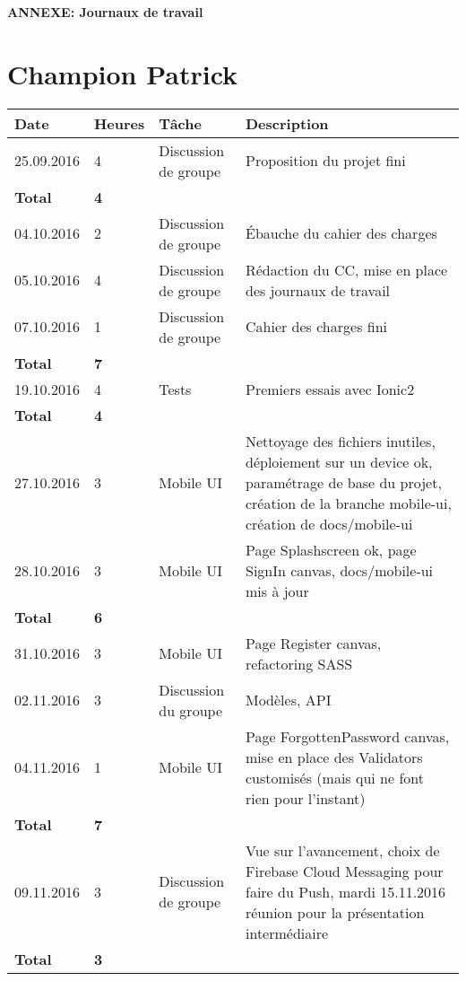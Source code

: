 \documentclass[french]{article}
\begin{document}
	\centering
	\large{\textbf{ANNEXE: Journaux de travail}}
	
	\justify
	
	\section*{Champion Patrick}
	\begin{longtable}{p{}|p{}|p{}|p{}}
		Date&Heures&Tâche&Description\\
		\hline \hline
		25.09.2016 & 4 & Discussion de groupe & Proposition du projet fini\\
		\textbf{Total} & \textbf{4} &&\\
		\hline
		04.10.2016 & 2 & Discussion de groupe & Ébauche du cahier des charges\\
		05.10.2016 & 4 & Discussion de groupe & Rédaction du CC, mise en place des journaux de travail\\
		07.10.2016 & 1 & Discussion de groupe & Cahier des charges fini\\
		\textbf{Total} & \textbf{7} &&\\
		\hline
		19.10.2016 & 4 & Tests & Premiers essais avec Ionic2\\
		\textbf{Total} & \textbf{4} &&\\
		\hline
		27.10.2016 & 3 & Mobile UI & Nettoyage des fichiers inutiles, déploiement sur un device ok, paramétrage de base du projet, création de la branche mobile-ui, création de docs/mobile-ui\\
		28.10.2016 & 3 & Mobile UI & Page Splashscreen ok, page SignIn canvas, docs/mobile-ui mis à jour\\
		\textbf{Total} & \textbf{6} &&\\
		\hline
		31.10.2016 & 3 & Mobile UI & Page Register canvas, refactoring SASS\\
		02.11.2016 & 3 & Discussion du groupe & Modèles, API\\
		04.11.2016 & 1 & Mobile UI & Page ForgottenPassword canvas, mise en place des Validators customisés (mais qui ne font rien pour l'instant)\\
		\textbf{Total} & \textbf{7} &&\\
		\hline
		09.11.2016 & 3 & Discussion de groupe & Vue sur l'avancement, choix de Firebase Cloud Messaging pour faire du Push, mardi 15.11.2016 réunion pour la présentation intermédiaire\\
		\textbf{Total} & \textbf{3} &&\\

\end{longtable}
\end{document}
